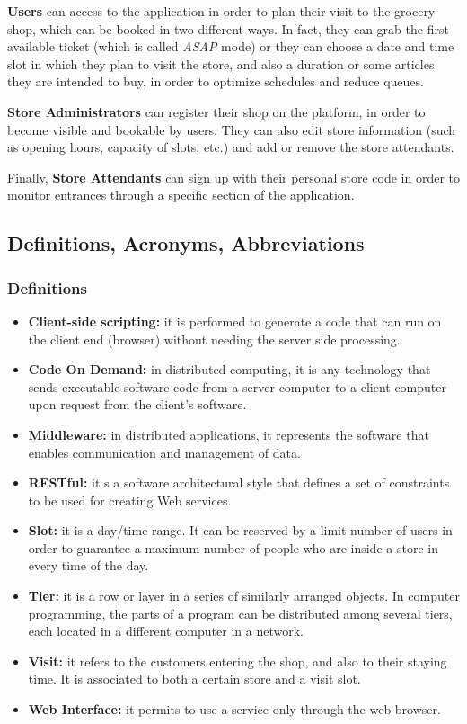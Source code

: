 \documentclass[table, 12pt]{article}
\begin{document}
\textbf{Users} can access to the application in order to plan their visit to the grocery shop, which can be booked in two different ways. In fact, they can grab the first available ticket (which is called \textit{ASAP} mode) or they can choose a date and time slot in which they plan to visit the store, and also a duration or some articles they are intended to buy, in order to optimize schedules and reduce queues.

\textbf{Store Administrators} can register their shop on the platform, in order to become visible and bookable by users. They can also edit store information (such as opening hours, capacity of slots, etc.) and add or remove the store attendants.

Finally, \textbf{Store Attendants} can sign up with their personal store code in order to monitor entrances through a specific section of the application.

\subsection{Definitions, Acronyms, Abbreviations}
\subsubsection{Definitions}
\begin{itemize}
    \item \textbf{Client-side scripting:} it is performed to generate a code that can run on the client end (browser) without needing the server side processing.
    \item \textbf{Code On Demand:} in distributed computing, it is any technology that sends executable software code from a server computer to a client computer upon request from the client's software.
    \item \textbf{Middleware:} in distributed applications, it represents the software that enables communication and management of data.
    \item \textbf{RESTful:} it s a software architectural style that defines a set of constraints to be used for creating Web services.
    \item \textbf{Slot:} it is a day/time range. It can be reserved by a limit number of users in order to guarantee a maximum number of people who are inside a store in every time of the day.
    \item \textbf{Tier:} it is a row or layer in a series of similarly arranged objects. In computer programming, the parts of a program can be distributed among several tiers, each located in a different computer in a network.
    \item \textbf{Visit:} it refers to the customers entering the shop, and also to their staying time. It is associated to both a certain store and a visit slot.
    \item \textbf{Web Interface:} it permits to use a service only through the web browser.
\end{itemize}
\end{document}
